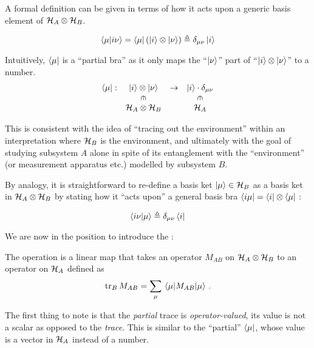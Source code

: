 A formal definition can be given in terms of how it acts upon a generic
basis element of $\mathcal{H}_A\otimes\mathcal{H}_B$.

\begin{definition}\label{def:pBra}
\[
  \braket{\mu}{i\nu} = \bra{\mu}\left(\ket{i}\otimes\ket{\nu}\right) \triangleq \delta_{\mu\nu}\ket{i}
\]
\end{definition}

Intuitively, $\bra{\mu}$ is a ``partial bra''
as it only maps the ``$\ket{\nu}$'' part of
``$\ket{i}\otimes\ket{\nu}$''
to a number.
\[
  \begin{array}{cccc}
    \bra{\mu}:  & \ket{i}\ox\ket{\nu}                   & \rightarrow & \ket{i}\cdot\delta_{\mu\nu}           \\
                & \rotatebox[origin=c]{270}{$\in$}      &             & \rotatebox[origin=c]{270}{$\in$}      \\
                & \hilb{H}_A\ox\hilb{H}_B               &             & \hilb{H}_A
  \end{array}
\]

This is consistent with the idea of
``tracing out the environment'' within an interpretation where
$\mathcal{H}_B$ is the environment, and ultimately with the goal of
studying subsystem $A$ alone in spite of its entanglement with the 
``environment'' (or measurement apparatus etc.) modelled by
subsystem $B$.

By analogy, it is straightforward to re-define a basis ket $\ket{\mu} \in \mathcal{H}_B$
as a basis ket in $\mathcal{H}_A \otimes \mathcal{H}_B$ by stating how it ``acts upon''
a general basis bra $\bra{i\mu} = \bra{i}\otimes\bra{\mu}$ :
\begin{definition}\label{def:pKet}
  \[
    \braket{i\nu}{\mu} \triangleq \delta_{\mu\nu}\bra{i}
  \]
\end{definition}

We are now in the position to introduce the :
\begin{definition}\label{def:pTr}
  The  operation
  is a linear map
  that takes an operator
  $M_{AB}$ on $\mathcal{H}_A \otimes \mathcal{H}_B$
  to an operator on $\mathcal{H}_A$ defined as
  \[
    \tr_B M_{AB} = \sum_{\mu} \matrixel{\mu}{M_{AB}}{\mu}
    \, \text{.}
  \]
\end{definition}

The first thing to note is that the \emph{partial} trace is \emph{operator-valued},
its value is not a scalar as opposed to the \emph{trace}.
This is similar to the ``partial'' $\bra{\mu}$, whose value is a vector in $\mathcal{H}_A$
instead of a number.

